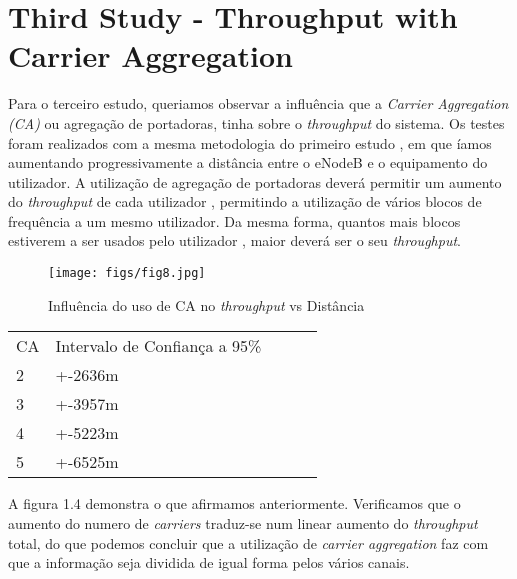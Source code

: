 \section{Third Study - Throughput with Carrier Aggregation} \label{ex3}
    Para o terceiro estudo, queriamos observar a influência que a \textit{Carrier Aggregation (CA)} ou 
agregação de portadoras, tinha sobre o \textit{throughput} do sistema. Os testes foram realizados com a mesma
metodologia do primeiro estudo , em que íamos aumentando progressivamente a distância entre o
eNodeB e o equipamento do utilizador.
    A utilização de agregação de portadoras deverá permitir um aumento do \textit{throughput} de cada
utilizador , permitindo a utilização de vários blocos de frequência a um mesmo utilizador. Da mesma forma, 
quantos mais blocos estiverem a ser usados pelo utilizador , maior deverá ser o seu \textit{throughput}.



\begin{figure}[H]
    \centering
    \texttt{[image: figs/fig8.jpg]}
    \caption{Influência do uso de CA no \textit{throughput} vs Distância}
    \label{fig:4}
\end{figure}
\begin{table}[H]
    \begin{tabular}{lllll}
    CA & Intervalo de Confiança a 95\%    &  &  &  \\
    2  & +-2636m &  &  &  \\
    3  & +-3957m &  &  &  \\
    4  & +-5223m &  &  &  \\
    5  & +-6525m &  &  &  \\
    \end{tabular}
    \end{table}

    A figura 1.4 demonstra o que afirmamos anteriormente. Verificamos que o aumento do numero
de \textit{carriers} traduz-se num linear aumento do \textit{throughput} total, do que podemos 
concluir que a utilização de \textit{carrier aggregation} faz com que a informação seja dividida de igual 
forma pelos vários canais.





